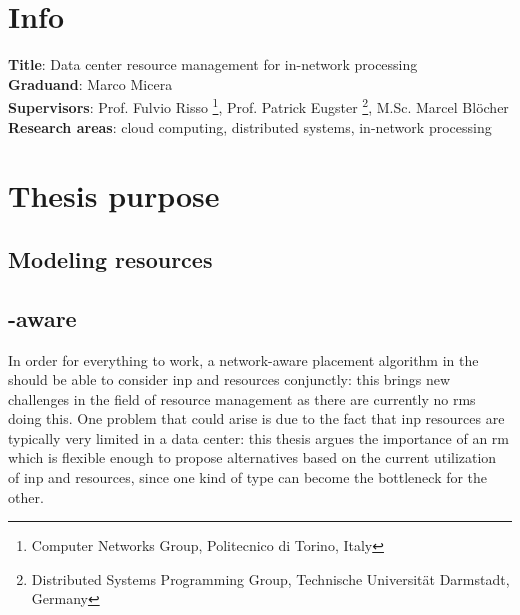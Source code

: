 


\noindent



%
%
%

\section{Info}
\textbf{Title}: Data center resource management for in-network processing\\
\textbf{Graduand}: Marco Micera\\
\textbf{Supervisors}: Prof. Fulvio Risso  \footnote[2]{\label{polito} Computer Networks Group, Politecnico di Torino, Italy}, Prof. Patrick Eugster \footnote[3]{\label{tuda} Distributed Systems Programming Group, Technische Universit{\"a}t Darmstadt, Germany}, M.Sc. Marcel Bl{\"o}cher \\
\textbf{Research areas}: cloud computing, distributed systems, in-network processing

\section{Thesis purpose}


\subsection{Modeling \texorpdfstring{}{INP} resources}


\subsection{\texorpdfstring{}{INP}-aware \texorpdfstring{}{Resource Managers}} \label{inp_aware_rms}
In order for everything to work, a network-aware placement algorithm in the  should be able to consider \gls{inp} and  resources conjunctly: this brings new challenges in the field of resource management as there are currently no \glspl{rm} doing this.
One problem that could arise is due to the fact that \gls{inp} resources are typically very limited in a data center: this thesis argues the importance of an \gls{rm} which is flexible enough to propose alternatives based on the current utilization of \gls{inp} and  resources, since one kind of  type can become the bottleneck for the other.

